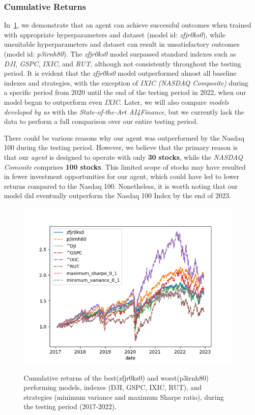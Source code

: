 \documentclass[../xlapes02]{subfiles}
\begin{document}
    \subsubsection{Cumulative Returns}
    In~\cref{fig:cumulative_return}, we demonstrate that an agent can achieve successful outcomes when trained with appropriate hyperparameters and dataset (model id: \emph{zfjr0ks0}), while unsuitable hyperparameters and dataset can result in unsatisfactory outcomes (model id: \emph{p3irnh80}). The \emph{zfjr0ks0} model surpassed standard indexes such as \emph{DJI}, \emph{GSPC}, \emph{IXIC}, and \emph{RUT}, although not consistently throughout the testing period. It is evident that the \emph{zfjr0ks0} model outperformed almost all baseline indexes and strategies, with the exception of \emph{IXIC (NASDAQ Composite)} during a specific period from 2020 until the end of the testing period in 2022, when our model began to outperform even \emph{IXIC}. Later, we will also compare \emph{models developed by us} with the \emph{State-of-the-Art AI4Finance}, but we currently lack the data to perform a full comparison over our entire testing period.

    There could be various reasons why our agent was outperformed by the Nasdaq 100 during the testing period. However, we believe that the primary reason is that our \emph{agent} is designed to operate with only \textbf{30 stocks}, while the \emph{NASDAQ Comosite} comprises \textbf{100 stocks}. This limited scope of stocks may have resulted in fewer investment opportunities for our agent, which could have led to lower returns compared to the Nasdaq 100. Nonetheless, it is worth noting that our model did eventually outperform the Nasdaq 100 Index by the end of 2023.
    \begin{figure}
        \centering
        \includegraphics[width=\linewidth]{image/figure/returns}
        \label{fig:cumulative_return}
        \caption{Cumulative returns of the best(zfjr0ks0) and worst(p3irnh80) performing models, indexes (DJI, GSPC, IXIC, RUT), and strategies (minimum variance and maximum Sharpe ratio), during the testing period (2017-2022).}
    \end{figure}
\end{document}
